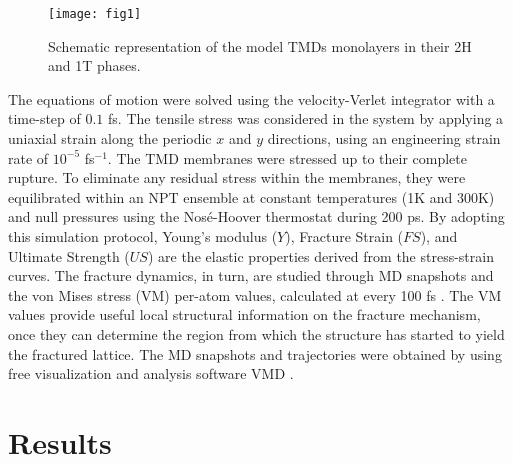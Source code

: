 \documentclass[a4paper,fleqn]{cas-sc}
\begin{document}
\begin{figure*}[pos=ht]
	\centering
	\texttt{[image: fig1]}
	\caption{Schematic representation of the model TMDs monolayers in their 2H and 1T phases.}
	\label{fig:structures}
\end{figure*}

The equations of motion were solved using the velocity-Verlet integrator with a time-step of $0.1$ fs. The tensile stress was considered in the system by applying a uniaxial strain along the periodic $x$ and $y$ directions, using an engineering strain rate of $10^{-5}$ fs$^{-1}$. The TMD membranes were stressed up to their complete rupture. To eliminate any residual stress within the membranes, they were equilibrated within an NPT ensemble at constant temperatures (1K and 300K) and null pressures using the Nos\'e-Hoover thermostat during 200 ps. By adopting this simulation protocol, Young’s modulus ($Y$), Fracture Strain ($FS$), and Ultimate Strength ($US$) are the elastic properties derived from the stress-strain curves. The fracture dynamics, in turn, are studied through MD snapshots and the von Mises stress (VM) per-atom values, calculated at every 100 fs \cite{pereirajr_FC}. The VM values provide useful local structural information on the fracture mechanism, once they can determine the region from which the structure has started to yield the fractured lattice. The MD snapshots and trajectories were obtained by using free visualization and analysis software VMD \cite{HUMPHREY199633}. 

\section{Results}
\end{document}
